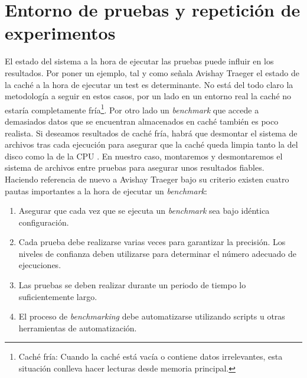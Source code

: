 


\begin{lstlisting}[language=bash]
\end{lstlisting}
\section{Entorno de pruebas y repetición de experimentos}
El estado del sistema a la hora de ejecutar las pruebas puede influir en los resultados. Por poner un ejemplo, tal y como señala Avishay Traeger \cite{traeger} el estado de la caché a la hora de ejecutar un test es determinante. No está del todo claro la metodología a seguir en estos casos, por un lado en un entorno real la caché no estaría completamente fría\footnote{Caché fría: Cuando la caché está vacía o contiene datos irrelevantes, esta situación conlleva hacer lecturas desde memoria principal.}. Por otro lado un \textit{benchmark} que accede a demasiados datos que se encuentran almacenados en caché también es poco realista. Si deseamos resultados de caché fría, habrá que desmontar el sistema de archivos tras cada ejecución para asegurar que la caché queda limpia tanto la del disco como la de la CPU \cite{traeger}. En nuestro caso, montaremos y desmontaremos el sistema de archivos entre pruebas para asegurar unos resultados fiables.\\

Haciendo referencia de nuevo a Avishay Traeger bajo su criterio existen cuatro pautas importantes \cite{traeger} a la hora de ejecutar un \textit{benchmark}: 

\begin{enumerate}
    \item Asegurar que cada vez que se ejecuta un \textit{benchmark} sea bajo idéntica configuración.
    \item Cada prueba debe realizarse varias veces para garantizar la precisión. Los niveles de confianza deben utilizarse para determinar el número adecuado de ejecuciones.
    \item Las pruebas se deben realizar durante un periodo de tiempo lo suficientemente largo.
    \item El proceso de \textit{benchmarking} debe automatizarse utilizando scripts u otras herramientas de automatización.
\end{enumerate}


